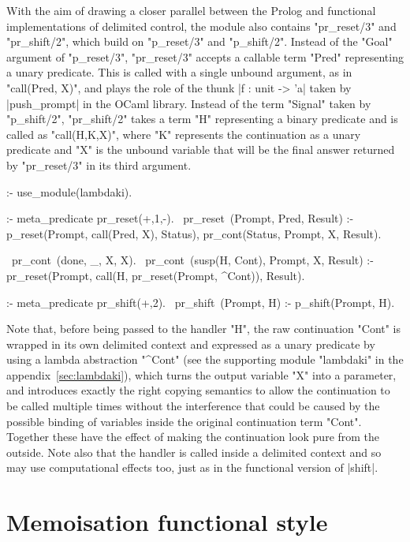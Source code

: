 With the aim of drawing a closer parallel between the Prolog and functional implementations of delimited
control, the module also contains "pr_reset/3" and "pr_shift/2", which build on "p_reset/3" and "p_shift/2".
Instead of the "Goal" argument of "p_reset/3", "pr_reset/3" accepts a callable term "Pred" representing a
unary predicate. This is called with a single unbound argument, as in "call(Pred, X)", and plays the role of the thunk
|f : unit -> 'a| taken by |push_prompt| in the OCaml library. Instead of the term "Signal" 
taken by "p_shift/2", "pr_shift/2" takes a term "H" representing a binary predicate and is called as
"call(H,K,X)", where "K" represents the continuation as a unary predicate 
and "X" is the unbound variable that will be the final answer returned by "pr_reset/3" in its third argument.
\begin{prolog-framed}[name=delimcc,firstnumber=15]%
  :- use_module(lambdaki).

  :- meta_predicate pr_reset(+,1,-).
  ~pr_reset~(Prompt, Pred, Result) :-
     p_reset(Prompt, call(Pred, X), Status),
     pr_cont(Status, Prompt, X, Result).

  ~pr_cont~(done, _, X, X).
  ~pr_cont~(susp(H, Cont), Prompt, X, Result) :-
     pr_reset(Prompt, call(H, pr_reset(Prompt, \X^Cont)), Result).

  :- meta_predicate pr_shift(+,2).
  ~pr_shift~(Prompt, H) :- p_shift(Prompt, H).
\end{prolog-framed}
Note that, before being passed to the handler "H", the raw continuation "Cont" is wrapped in its
own delimited context
and expressed as a unary predicate by using a lambda abstraction "\X^Cont" (see the supporting
module "lambdaki" in the appendix~\ref{sec:lambdaki}), which turns the 
output variable "X" into a parameter,
and introduces exactly the right copying semantics to allow the continuation to be
called multiple times without the interference that could be caused by the possible
binding of variables inside the original continuation term "Cont". Together these have the
effect of making the continuation look pure from the outside. Note also that the handler
is called inside a delimited context and so may use computational effects too, just as
in the functional version of |shift|.

\section{Memoisation functional style}

